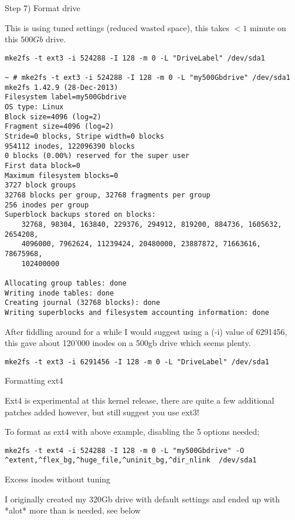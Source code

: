 \begin{itemize}
Step 7) Format drive

This is using tuned settings (reduced wasted space), this takes $< 1$ minute on this $500Gb$ drive.

\begin{verbatim}
mke2fs -t ext3 -i 524288 -I 128 -m 0 -L "DriveLabel" /dev/sda1

~ # mke2fs -t ext3 -i 524288 -I 128 -m 0 -L "my500Gbdrive" /dev/sda1
mke2fs 1.42.9 (28-Dec-2013)
Filesystem label=my500Gbdrive
OS type: Linux
Block size=4096 (log=2)
Fragment size=4096 (log=2)
Stride=0 blocks, Stripe width=0 blocks
954112 inodes, 122096390 blocks
0 blocks (0.00%) reserved for the super user
First data block=0
Maximum filesystem blocks=0
3727 block groups
32768 blocks per group, 32768 fragments per group
256 inodes per group
Superblock backups stored on blocks: 
	32768, 98304, 163840, 229376, 294912, 819200, 884736, 1605632, 2654208, 
	4096000, 7962624, 11239424, 20480000, 23887872, 71663616, 78675968, 
	102400000

Allocating group tables: done                            
Writing inode tables: done                            
Creating journal (32768 blocks): done
Writing superblocks and filesystem accounting information: done   
\end{verbatim}

After fiddling around for a while I would suggest using a (-i) value of 6291456, this gave about 120'000 inodes on a 500gb drive which seems plenty.

\begin{verbatim}
mke2fs -t ext3 -i 6291456 -I 128 -m 0 -L "DriveLabel" /dev/sda1
\end{verbatim}

Formatting ext4

    Ext4 is experimental at this kernel release, there are quite a few additional patches added however, but still suggest you use ext3!

To format as ext4 with above example, disabling the 5 options needed;

\begin{verbatim}
mke2fs -t ext4 -i 524288 -I 128 -m 0 -L "my500Gbdrive" -O ^extent,^flex_bg,^huge_file,^uninit_bg,^dir_nlink  /dev/sda1
\end{verbatim}

Excess inodes without tuning

I originally created my 320Gb drive with default settings and ended up with *alot* more than is needed, see below


\end{itemize}

